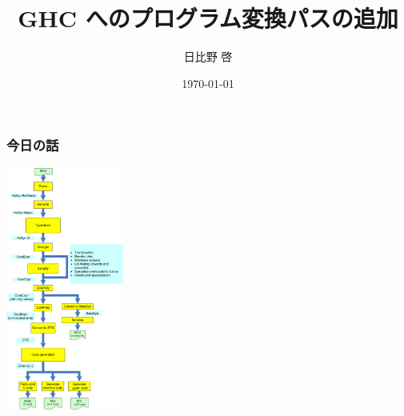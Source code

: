 \documentclass[cjk,dvipdfm,14pt]{beamer}
\title{GHC へのプログラム変換パスの追加}
\author{日比野 啓}
\date{ \today }
\begin{document}
\lstset{language=Haskell,basicstyle=\small\ttfamily}

\begin{frame}

\maketitle

\end{frame}


\begin{frame}[fragile]
\frametitle{今日の話}

\includegraphics[height=8cm]{./HscPipe2.png}

\end{frame}
\end{document}
